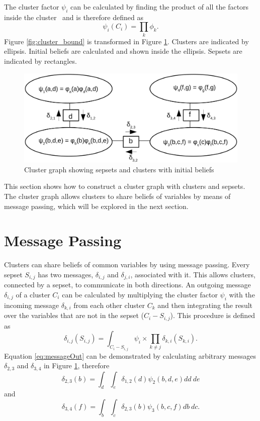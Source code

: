 \documentclass[12pt,oneside,openany,a4paper, %
afrikaans,english,
]{memoir}
\numberwithin{equation}{chapter}
\begin{document}
The cluster factor $\psi_i$ can be calculated by finding the product of all the factors inside the cluster~\citep{koller} and is therefore defined as
\begin{equation}
\psi_i(C_i) = \prod_{k}\phi_k.
\end{equation}
Figure \ref{fig:cluster_bound} is transformed in Figure \ref{fig:clustergraph}. Clusters are indicated by ellipsis. Initial beliefs are calculated and shown inside the ellipsis. Sepsets are indicated by rectangles.
\begin{figure}[H]
  \includegraphics[width=0.7\linewidth]{Figures/clustergraph.png}
  \centering
  \caption{Cluster graph showing sepsets and clusters with initial beliefs}
  \label{fig:clustergraph}
\end{figure}
This section shows how to construct a cluster graph with clusters and sepsets. The cluster graph allows clusters to share beliefs of variables by means of message passing, which will be explored in the next section. 
\section{Message Passing}
Clusters can share beliefs of common variables by using message passing. Every sepset $S_{i,j}$ has two messages, $\delta_{i, j}$ and $\delta_{j,i}$, associated with it. This allows clusters, connected by a sepset, to communicate in both directions. An outgoing message $\delta_{i,j}$ of a cluster $C_i$ can be calculated by multiplying the cluster factor $\psi_i$ with the incoming message $\delta_{k,i}$ from each other cluster $C_k$ and then integrating the result over the variables that are not in the sepset ($C_i - S_{i,j}$). This procedure is defined as~\citep{koller}
\begin{equation}\label{eq:messageOut}
\delta_{i,j}(S_{i,j}) = \int_{C_i - S_{i,j}}\psi_i \times \prod_{k\ne j} \delta_{k,i}(S_{k,i}).
\end{equation}
Equation \ref{eq:messageOut} can be demonstrated by calculating arbitrary messages $\delta_{2,3}$ and $\delta_{3,4}$ in Figure \ref{fig:clustergraph}, therefore
\begin{equation}
\delta_{2,3}(b) = \int_d \int_e \delta_{1,2}(d)\psi_2(b,d,e)dd\ de
\end{equation}
and
\begin{equation}\label{eq:mes34}
\delta_{3,4}(f) = \int_b \int_c \delta_{2,3}(b)\psi_3(b,c,f)db\ dc.
\end{equation}
\end{document}
